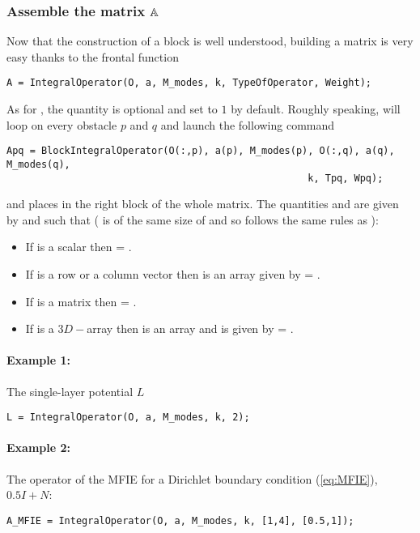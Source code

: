\subsubsection{Assemble the matrix ${\mathbb{A}}$}

Now that the construction of a block is well understood, building a matrix is very easy thanks to the frontal function
\begin{verbatim}
A = IntegralOperator(O, a, M_modes, k, TypeOfOperator, Weight);
\end{verbatim}
As for , the quantity  is optional and set to $1$ by default. Roughly speaking,  will loop on every obstacle $p$ and $q$ and launch the following command
\begin{verbatim}
Apq = BlockIntegralOperator(O(:,p), a(p), M_modes(p), O(:,q), a(q), M_modes(q), 
                                                    k, Tpq, Wpq);
\end{verbatim}
and places  in the right block of the whole matrix. The quantities  and  are given by  and  such that ( is of the same size of  and so  follows the same rules as ):
\begin{itemize}
\item If  is a scalar then  = . 
\item If  is a row or a column vector then  is an array given by  = . 
\item If  is a matrix then  = . 
\item If  is a $3D-$array then  is an array and is given by  = . 
\end{itemize}

\paragraph{Example 1:} The single-layer potential $L$
\begin{verbatim}
L = IntegralOperator(O, a, M_modes, k, 2);
\end{verbatim}
\paragraph{Example 2:} The operator of the MFIE for a Dirichlet boundary condition (\ref{eq:MFIE}), $0.5I + N$:
\begin{verbatim}
A_MFIE = IntegralOperator(O, a, M_modes, k, [1,4], [0.5,1]);
\end{verbatim}
